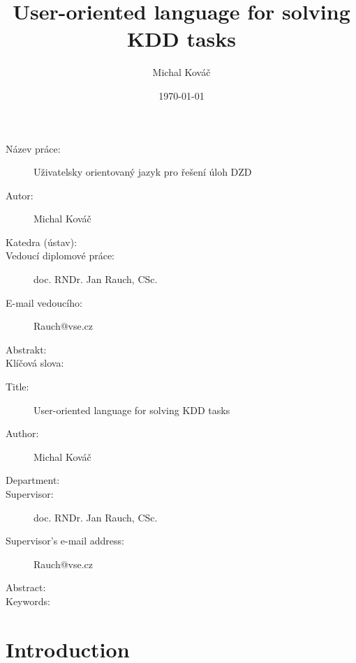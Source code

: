 \documentclass[a4paper,12pt]{book}
\author{Michal Kováč}
\title{User-oriented language for solving KDD tasks}
\date{\today}
\begin{document}
\maketitle

\begin{description}
 \item [Název práce:] Uživatelsky orientovaný jazyk pro řešení úloh DZD
 \item [Autor:] Michal Kováč
 \item [Katedra (ústav):]
 \item [Vedoucí diplomové práce:] doc. RNDr. Jan Rauch, CSc.
 \item [E-mail vedoucího:] Rauch@vse.cz
 \item [Abstrakt:]
 \item [Klíčová slova:]
\end{description}

\medskip

\begin{description}
 \item [Title:] User-oriented language for solving KDD tasks
 \item [Author:] Michal Kováč
 \item [Department:]
 \item [Supervisor:] doc. RNDr. Jan Rauch, CSc.
 \item [Supervisor's e-mail address:] Rauch@vse.cz
 \item [Abstract:]
 \item [Keywords:]
\end{description}
\newpage
\tableofcontents

\chapter{Introduction}
\end{document}
